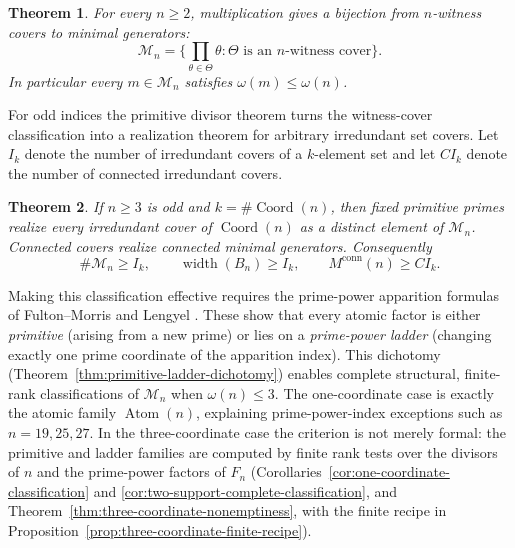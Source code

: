 \documentclass[11pt,letterpaper]{article}
\numberwithin{equation}{section}
\theoremstyle{plain}
\newtheorem{theorem}{Theorem}[section]
\theoremstyle{definition}
\theoremstyle{remark}
\DeclareMathOperator{\Atom}{Atom}
\DeclareMathOperator{\widthop}{width}
\DeclareMathOperator{\Coord}{Coord}
\begin{document}
\begin{theorem}\label{thm:intro-witness}
For every \(n\ge2\), multiplication gives a bijection from \(n\)-witness
covers to minimal generators:
\[
\mathcal M_n=
\bigl\{\prod_{\theta\in\Theta}\theta:\Theta\text{ is an \(n\)-witness cover}\bigr\}.
\]
In particular every \(m\in\mathcal M_n\) satisfies
\(\omega(m)\le\omega(n)\).
\end{theorem}

For odd indices the primitive divisor theorem turns the witness-cover
classification into a realization theorem for arbitrary irredundant set covers.
Let \(I_k\) denote the number of irredundant covers of a \(k\)-element set and
let \(CI_k\) denote the number of connected irredundant covers.

\begin{theorem}\label{thm:intro-odd-irredundant}
If \(n\ge3\) is odd and \(k=\#\Coord(n)\), then fixed primitive primes realize every
irredundant cover of \(\Coord(n)\) as a distinct element of \(\mathcal M_n\).
Connected covers realize connected minimal generators. Consequently
\[
\#\mathcal M_n\ge I_k,
\qquad
\widthop(B_n)\ge I_k,
\qquad
M^{\mathrm{conn}}(n)\ge CI_k.
\]
\end{theorem}

Making this classification effective requires the prime-power apparition
formulas of Fulton--Morris \cite{FultonMorris1969ArithmeticalFunctions} and
Lengyel \cite{Lengyel1995OrderFibonacciLucas}. These show that every atomic
factor is either \emph{primitive} (arising from a new prime) or lies on a
\emph{prime-power ladder} (changing exactly one prime coordinate of the
apparition index). This dichotomy
(Theorem~\ref{thm:primitive-ladder-dichotomy}) enables complete structural,
finite-rank classifications of $\mathcal M_n$ when $\omega(n)\le 3$.  The one-coordinate
case is exactly the atomic family \(\Atom(n)\), explaining prime-power-index
exceptions such as \(n=19,25,27\). In the three-coordinate case the criterion
is not merely formal: the primitive and ladder families are computed by
finite rank tests over the divisors of \(n\) and the prime-power factors of
\(F_n\)
(Corollaries~\ref{cor:one-coordinate-classification} and
\ref{cor:two-support-complete-classification}, and
Theorem~\ref{thm:three-coordinate-nonemptiness}, with the finite recipe in
Proposition~\ref{prop:three-coordinate-finite-recipe}).
\end{document}
